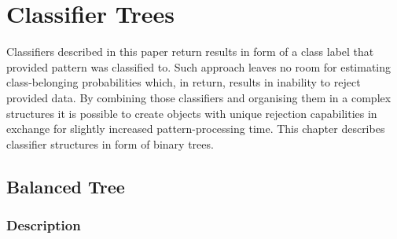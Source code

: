 \chapter{Classifier Trees}

Classifiers described in this paper return results in form of a class label that provided pattern was classified to. Such approach leaves no room for estimating class-belonging probabilities which, in return, results in inability to reject provided data. By combining those classifiers and organising them in a complex structures it is possible to create objects with unique rejection capabilities in exchange for slightly increased pattern-processing time. This chapter describes classifier structures in form of binary trees.

\section{Balanced Tree}

\subsection{Description}

